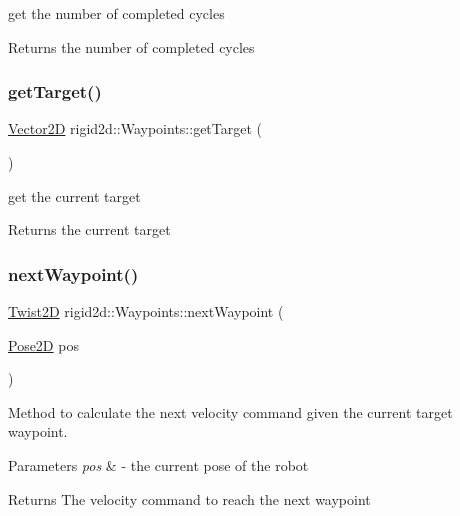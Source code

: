 get the number of completed cycles 

\begin{DoxyReturn}{Returns}
the number of completed cycles 
\end{DoxyReturn}
\mbox{\label{classrigid2d_1_1Waypoints_a2d50627bc6c0b74b247bebe0bdbcec38}} 
\subsubsection{\texorpdfstring{get\+Target()}{getTarget()}}
{\footnotesize\ttfamily \hyperlink{structrigid2d_1_1Vector2D}{Vector2D} rigid2d\+::\+Waypoints\+::get\+Target (\begin{DoxyParamCaption}{ }\end{DoxyParamCaption})}



get the current target 

\begin{DoxyReturn}{Returns}
the current target 
\end{DoxyReturn}
\mbox{\label{classrigid2d_1_1Waypoints_acf263076e58543a95391476650f84c85}} 
\subsubsection{\texorpdfstring{next\+Waypoint()}{nextWaypoint()}}
{\footnotesize\ttfamily \hyperlink{structrigid2d_1_1Twist2D}{Twist2D} rigid2d\+::\+Waypoints\+::next\+Waypoint (\begin{DoxyParamCaption}\item[{\hyperlink{structrigid2d_1_1Pose2D}{Pose2D}}]{pos }\end{DoxyParamCaption})}



Method to calculate the next velocity command given the current target waypoint. 


\begin{DoxyParams}{Parameters}
{\em pos} & -\/ the current pose of the robot \\
\hline
\end{DoxyParams}
\begin{DoxyReturn}{Returns}
The velocity command to reach the next waypoint 
\end{DoxyReturn}
\mbox{\label{classrigid2d_1_1Waypoints_a2b29f071318d349824d8b704d01e32bf}} 
